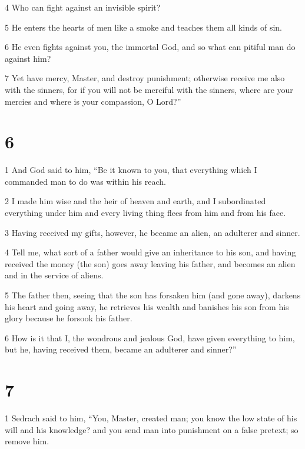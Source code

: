 \par 4 Who can fight against an invisible spirit? 

\par 5 He enters the hearts of men like a smoke and teaches them all kinds of sin. 

\par 6 He even fights against you, the immortal God, and so what can pitiful man do against him? 

\par 7 Yet have mercy, Master, and destroy punishment; otherwise receive me also with the sinners, for if you will not be merciful with the sinners, where are your mercies and where is your compassion, O Lord?” 


\chapter{6}

\par 1 And God said to him, “Be it known to you, that everything which I commanded man to do was within his reach. 

\par 2 I made him wise and the heir of heaven and earth, and I subordinated everything under him and every living thing flees from him and from his face. 

\par 3 Having received my gifts, however, he became an alien, an adulterer and sinner. 

\par 4 Tell me, what sort of a father would give an inheritance to his son, and having received the money (the son) goes away leaving his father, and becomes an alien and in the service of aliens. 

\par 5 The father then, seeing that the son has forsaken him (and gone away), darkens his heart and going away, he retrieves his wealth and banishes his son from his glory because he forsook his father. 

\par 6 How is it that I, the wondrous and jealous God, have given everything to him, but he, having received them, became an adulterer and sinner?” 

\chapter{7}

\par 1 Sedrach said to him, “You, Master, created man; you know the low state of his will and his knowledge? and you send man into punishment on a false pretext; so remove him. 

